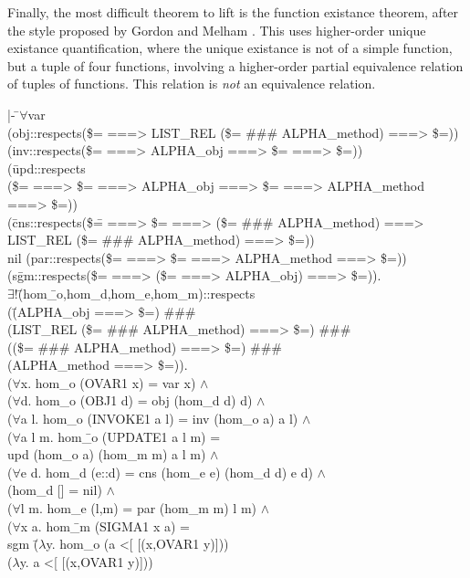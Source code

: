 \documentclass[envcountsame,runningheads]{llncs}
\newcommand{\quotient}{partial equivalence}
\begin{document}
Finally, the most difficult theorem to lift is the function existance
theorem, after the style proposed by Gordon and Melham \cite{GoMe96}. 
This uses higher-order unique existance quantification,
where the unique existance is not of a simple function,
but a tuple of four functions, involving a higher-order
\quotient{} relation of tuples of functions.  This relation is {\it not\/}
an equivalence relation.
{\tt \begin{tabbing}
|- \=$\forall$var \\
\> (obj::respects(\$= ===> LIST\_REL (\$= \#\#\# ALPHA\_method) ===> \$=)) \\
\> (inv::respects(\$= ===> ALPHA\_obj ===> \$= ===> \$=)) \\
\> (\=upd::respects \\
\>\>(\$= ===> \$= ===> ALPHA\_obj ===> \$= ===> ALPHA\_method ===> \$=)) \\
\> (\=cns::respects(\$\= = ===> \$= ===> (\$= \#\#\# ALPHA\_method) ===> \\
\>\>\>             LIST\_REL (\$= \#\#\# ALPHA\_method) ===> \$=)) \\
\>\>nil (par::respects(\$= ===> \$= ===> ALPHA\_method ===> \$=)) \\
\> (s\=gm::respects(\$= ===> (\$= ===> ALPHA\_obj) ===> \$=)). \\
\>\> $\exists !$\=(hom\=\_o,hom\_d,hom\_e,hom\_m)::respects \\
\>\>\>\>   (\=(ALPHA\_obj ===> \$=) \#\#\# \\
\>\>\>\>\>  (LIST\_REL (\$= \#\#\# ALPHA\_method) ===> \$=) \#\#\# \\
\>\>\>\>\>  ((\$= \#\#\# ALPHA\_method) ===> \$=) \#\#\# \\
\>\>\>\>\>  (ALPHA\_method ===> \$=)). \\
\>\>\>($\forall$x. hom\_o (OVAR1 x) = var x) $\wedge$ \\
\>\>\>($\forall$d. hom\_o (OBJ1 d) = obj (hom\_d d) d) $\wedge$ \\
\>\>\>($\forall$a l. hom\_o (INVOKE1 a l) = inv (hom\_o a) a l) $\wedge$ \\
\>\>\>($\forall$a l m. hom\=\_o (UPDATE1 a l m) = \\
\>\>\>\>          upd (hom\_o a) (hom\_m m) a l m) $\wedge$ \\
\>\>\>($\forall$e d. hom\_d (e::d) = cns (hom\_e e) (hom\_d d) e d) $\wedge$ \\
\>\>\>(hom\_d [] = nil) $\wedge$ \\
\>\>\>($\forall$l m. hom\_e (l,m) = par (hom\_m m) l m) $\wedge$ \\
\>\>\>($\forall$x a. hom\=\_m (SIGMA1 x a) = \\
\>\>\>\>        sgm \=($\lambda$y. hom\_o (a <[ [(x,OVAR1 y)])) \\
\>\>\>\>\>          ($\lambda$y. a <[ [(x,OVAR1 y)]))
\end{tabbing}}
\end{document}
